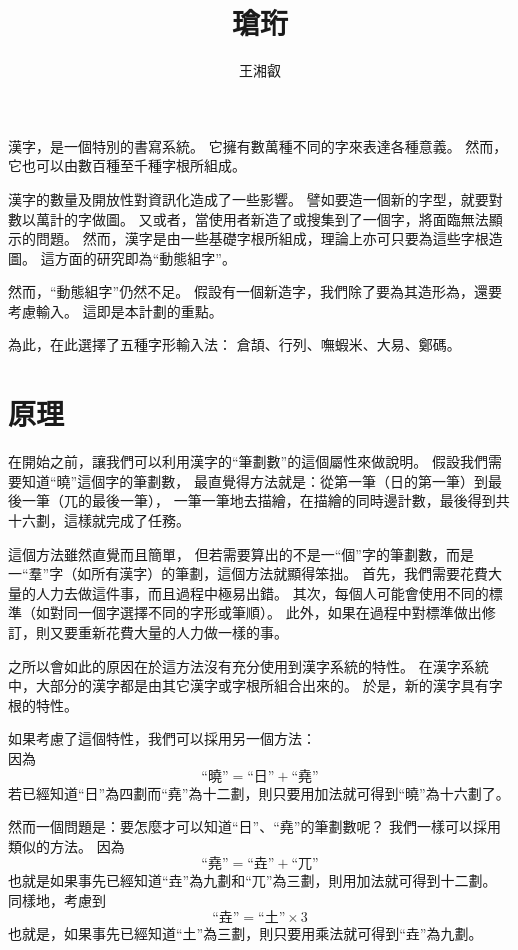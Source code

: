 \documentclass{article}
\title{瑲珩}
\author{王湘叡}
\begin{document}
\maketitle{}

漢字，是一個特別的書寫系統。%
它擁有數萬種不同的字來表達各種意義。%
然而，它也可以由數百種至千種字根所組成。

漢字的數量及開放性對資訊化造成了一些影響。
譬如要造一個新的字型，就要對數以萬計的字做圖。
又或者，當使用者新造了或搜集到了一個字，將面臨無法顯示的問題。
然而，漢字是由一些基礎字根所組成，理論上亦可只要為這些字根造圖。
這方面的研究即為``動態組字''。

然而，``動態組字''仍然不足。
假設有一個新造字，我們除了要為其造形為，還要考慮輸入。
這即是本計劃的重點。

為此，在此選擇了五種字形輸入法：
倉頡、行列、嘸蝦米、大易、鄭碼。

\section{原理}
在開始之前，讓我們可以利用漢字的``筆劃數''的這個屬性來做說明。%
假設我們需要知道``曉''這個字的筆劃數，%
最直覺得方法就是：從第一筆（日的第一筆）到最後一筆（兀的最後一筆），%
一筆一筆地去描繪，在描繪的同時邊計數，最後得到共十六劃，這樣就完成了任務。%

這個方法雖然直覺而且簡單，%
但若需要算出的不是一``個''字的筆劃數，而是一``羣''字（如所有漢字）的筆劃，這個方法就顯得笨拙。
首先，我們需要花費大量的人力去做這件事，而且過程中極易出錯。
其次，每個人可能會使用不同的標準（如對同一個字選擇不同的字形或筆順）。
此外，如果在過程中對標準做出修訂，則又要重新花費大量的人力做一樣的事。

之所以會如此的原因在於這方法沒有充分使用到漢字系統的特性。
在漢字系統中，大部分的漢字都是由其它漢字或字根所組合出來的。
於是，新的漢字具有字根的特性。

如果考慮了這個特性，我們可以採用另一個方法：\\
因為\\
\[
  \mbox{``曉''}=\mbox{``日''}+\mbox{``堯''}
\]
若已經知道``日''為四劃而``堯''為十二劃，則只要用加法就可得到``曉''為十六劃了。%

然而一個問題是：要怎麼才可以知道``日''、``堯''的筆劃數呢？%
我們一樣可以採用類似的方法。
因為\\
\[
  \mbox{``堯''}=\mbox{``垚''}+\mbox{``兀''}
\]
也就是如果事先已經知道``垚''為九劃和``兀''為三劃，則用加法就可得到十二劃。
同樣地，考慮到\\
\[
  \mbox{``垚''}=\mbox{``土''}\times 3
\]
也就是，如果事先已經知道``土''為三劃，則只要用乘法就可得到``垚''為九劃。
\end{document}
